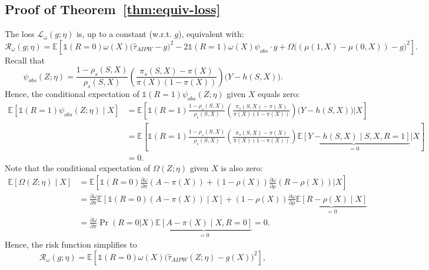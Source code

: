 \documentclass{article}
\theoremstyle{plain}
\theoremstyle{definition}
\theoremstyle{remark}
\newcommand{\E}{\mathbb{E}}                %
\newcommand{\1}{\mathds{1}}                %
\begin{document}
\subsection{Proof of Theorem~\ref{thm:equiv-loss}}
The loss $\mathcal{L}_\omega(g;\eta)$ is, up to a constant (w.r.t. $g$), equivalent with:
\begin{equation}
    \mathcal{R}_\omega(g;\eta)=\E\left[\1(R=0) \omega(X) \big(\hat{\tau}_{AIPW} -g \big)^2- 2\1(R=1) \omega(X) \psi_{obs}\cdot g + \Omega\big( (\mu(1,X)-\mu(0,X)) - g \big)^2\right].
\end{equation}
Recall that
\begin{equation}
    \psi_{obs}(Z;\eta) = \frac{1-\rho_s(S,X)}{\rho_s(S,X)} \left( \frac{\pi_s(S,X) - \pi(X)}{\pi(X)(1-\pi(X))} \right) \big( Y - h(S,X) \big).
\end{equation}
Hence, the conditional expectation of $\1(R=1)\psi_{obs}(Z;\eta)$ given $X$ equals zero:
\begin{align}
    \E\left[\1(R=1)\psi_{obs}(Z;\eta) \mid X\right] &= \E\left[ \1(R=1) \frac{1-\rho_s(S,X)}{\rho_s(S,X)} \left( \frac{\pi_s(S,X) - \pi(X)}{\pi(X)(1-\pi(X))} \right) \big( Y - h(S,X) \big) \Bigg| X \right] \\
    &= \E\left[ \1(R=1) \frac{1-\rho_s(S,X)}{\rho_s(S,X)} \left( \frac{\pi_s(S,X) - \pi(X)}{\pi(X)(1-\pi(X))} \right) \underbrace{\E[Y - h(S,X) \mid S, X, R=1]}_{=0} \Bigg| X \right] \\
    &= 0.
\end{align}
Note that the conditional expectation of $\Omega(Z;\eta)$ given $X$ is also zero:
\begin{align}
    \E\left[\Omega(Z;\eta) \mid X\right] &= \E\left[ \1(R=0) \frac{\partial \omega}{\partial \pi} (A - \pi(X)) + (1-\rho(X)) \frac{\partial \omega}{\partial \rho} (R - \rho(X)) \Bigg| X \right] \\
    &= \frac{\partial \omega}{\partial \pi} \E\left[\1(R=0)(A - \pi(X)) \mid X\right] + (1-\rho(X)) \frac{\partial \omega}{\partial \rho} \underbrace{\E\left[R - \rho(X) \mid X\right]}_{=0} \\
    &= \frac{\partial \omega}{\partial \pi} \Pr(R=0|X) \underbrace{\E\left[A - \pi(X) \mid X, R=0\right]}_{=0} = 0. \label{exp-Omega-zero}
\end{align}
Hence, the risk function simplifies to
\begin{equation}
\label{eq:simplified-risk}
    \mathcal{R}_\omega(g;\eta)=\E\left[\1(R=0) \omega(X) \big(\hat{\tau}_{AIPW}(Z;\eta) -g(X) \big)^2\right],
\end{equation}
\end{document}
